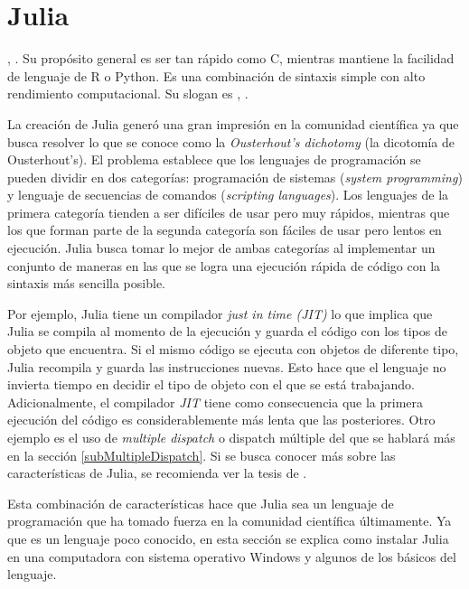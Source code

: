 \chapter{Julia} \label{cap_julia}

, \cite{Hackers}.  Su propósito general es ser tan rápido como \textsf{C}, mientras mantiene la facilidad de lenguaje de \textsf{R} o \textsf{Python}. Es una combinación de sintaxis simple con alto rendimiento computacional. Su slogan es , \cite{Hackers}. 

La creación de \textsf{Julia} generó una gran impresión en la comunidad científica ya que busca resolver lo que se conoce como la \textit{Ousterhout's dichotomy} (la dicotomía de Ousterhout's). El problema establece que los lenguajes de programación se pueden dividir en dos categorías: programación de sistemas (\textit{system programming}) y lenguaje de secuencias de comandos (\textit{scripting languages}). Los lenguajes de la primera categoría tienden a ser difíciles de usar pero muy rápidos, mientras que los que forman parte de la segunda categoría son fáciles de usar pero lentos en ejecución. \textsf{Julia} busca tomar lo mejor de ambas categorías al implementar un conjunto de maneras en las que se logra una ejecución rápida de código con la sintaxis más sencilla posible. 

Por ejemplo, \textsf{Julia} tiene un compilador \textit{just in time (JIT)} lo que implica que \textsf{Julia} se compila al momento de la ejecución y guarda el código con los tipos de objeto que encuentra. Si el mismo código se ejecuta con objetos de diferente tipo, \textsf{Julia} recompila y guarda las instrucciones nuevas. Esto hace que el lenguaje no invierta tiempo en decidir el tipo de objeto con el que se está trabajando. Adicionalmente, el compilador \textit{JIT} tiene como consecuencia que la primera ejecución del código es considerablemente más lenta que las posteriores. Otro ejemplo es el uso de \textit{multiple dispatch} o dispatch múltiple del que se hablará más en la sección \ref{subMultipleDispatch}. Si se busca conocer más sobre las características de \textsf{Julia}, se recomienda ver la tesis de \cite{tesis_bezanson}. 

Esta combinación de características hace que \textsf{Julia} sea un lenguaje de programación que ha tomado fuerza  en la comunidad científica últimamente. Ya que es un lenguaje poco conocido, en esta sección se explica como instalar \textsf{Julia} en una computadora con sistema operativo \textsf{Windows} y algunos de los básicos del lenguaje.


